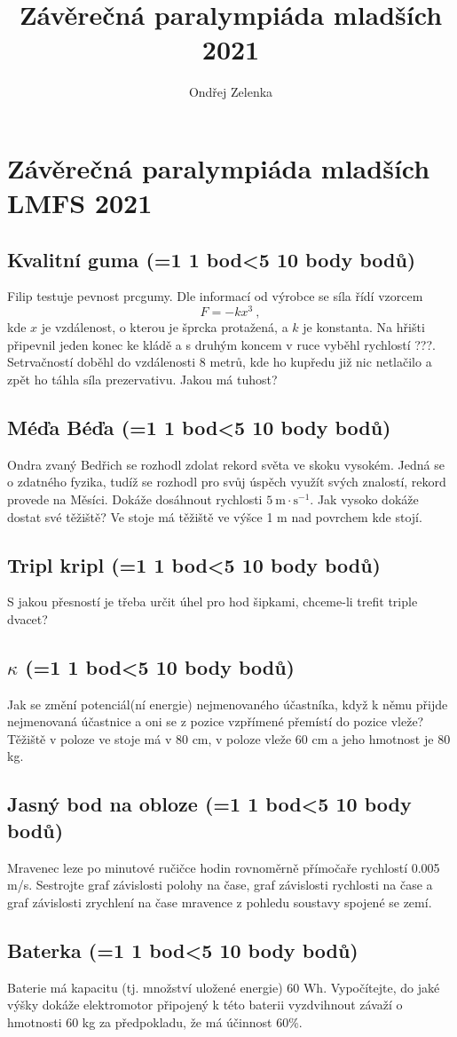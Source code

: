 \documentclass[10pt,a4paper,landscape,twocolumn]{article}
\author{Ondřej Zelenka}
\title{Závěrečná paralympiáda mladších 2021}
\newcounter{bodycounter}
\newcommand{\bodystring}[1]{\ifnum #1=1 1 bod\else\ifnum #1<5 #1 body\else #1 bodů\fi\fi}
\newcommand{\uloha}[3]{
\subsection{#1 (\bodystring{#2})}
#3\addtocounter{bodycounter}{#2}}
\begin{document}
\section*{Závěrečná paralympiáda mladších LMFS 2021}

\uloha{Kvalitní guma}{10}{
Filip testuje pevnost prcgumy. Dle informací od výrobce se síla řídí vzorcem
\begin{equation}
F = -kx^3 ~,
\end{equation}
kde $x$ je vzdálenost, o kterou je šprcka protažená, a $k$ je konstanta. Na hřišti připevnil jeden konec ke kládě a s druhým koncem v ruce vyběhl rychlostí ???. Setrvačností doběhl do vzdálenosti 8 metrů, kde ho kupředu již nic netlačilo a zpět ho táhla síla prezervativu. Jakou má tuhost?
}


\uloha{Méďa Béďa}{10}{
Ondra zvaný Bedřich se rozhodl zdolat rekord světa ve skoku vysokém. Jedná se o zdatného fyzika, tudíž se rozhodl pro svůj úspěch využít svých znalostí, rekord provede na Měsíci. Dokáže dosáhnout rychlosti $5~\mathrm{m\cdot s^{-1}}$. Jak vysoko dokáže dostat své těžiště? Ve stoje má těžiště ve výšce 1 m nad povrchem kde stojí.
}

\uloha{Tripl kripl}{10}{
S jakou přesností je třeba určit úhel pro hod šipkami, chceme-li trefit triple dvacet?
}

\uloha{$\kappa$}{10}{
Jak se změní potenciál(ní energie) nejmenovaného účastníka, když k němu přijde nejmenovaná účastnice a oni se z pozice vzpřímené přemístí do pozice vleže? Těžiště v poloze ve stoje má v 80 cm, v poloze vleže 60 cm a jeho hmotnost je 80 kg.
}

\uloha{Jasný bod na obloze}{10}{
Mravenec leze po minutové ručičce hodin rovnoměrně přímočaře rychlostí 0.005 m/s. Sestrojte graf závislosti polohy na čase, graf závislosti rychlosti na čase a graf závislosti zrychlení na čase mravence z pohledu soustavy spojené se zemí.
}

\uloha{Baterka}{10}{
Baterie má kapacitu (tj. množství uložené energie) 60 Wh. Vypočítejte, do jaké výšky dokáže elektromotor připojený k této baterii vyzdvihnout závaží o hmotnosti 60 kg za předpokladu, že má účinnost 60\%.
}
\end{document}
